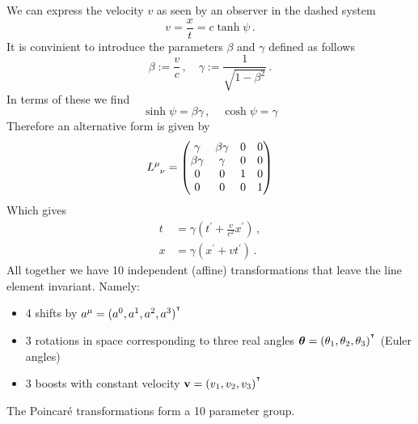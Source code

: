   We can express the velocity $v$ as seen by an observer in the dashed system
  \begin{equation}
  v=\frac{x}{t}=c\tanh\psi\,.
  \end{equation}
  It is convinient to introduce the parameters $\beta$ and $\gamma$ defined as
  follows
  \begin{equation}
  \beta:=\frac{v}{c}\, ,\quad\gamma:=\frac{1}{\sqrt{1-\beta^2}}\, .
  \end{equation}
  In terms of these we find
  \begin{equation}
  \sinh\psi = \beta\gamma\, , \quad \cosh\psi=\gamma
  \end{equation}
  Therefore an alternative form is given by
  \begin{equation}
  \tensor{L}{^\mu_\nu}=\begin{pmatrix}
  \gamma&\beta\gamma & 0&0\\
  \beta\gamma&\gamma &0&0\\
  0&0&1 &0\\
  0&0 &0 &1
  \end{pmatrix}
  \end{equation}
  Which gives 
  \begin{align}
  t&=\gamma\left(t^\prime+\frac{v}{c^2}x^\prime\right)\, ,\\
  x&=\gamma\left(x^\prime+vt^\prime\right)\, .
  \end{align}
All together we have 10 independent (affine) transformations that leave the line
element invariant. Namely:
\begin{itemize}
  \item 4 shifts by $a^\mu=(a^0,a^1,a^2,a^3)^{^\intercal}$
  \item 3 rotations in space corresponding to three real angles
  $\boldsymbol{\theta}=(\theta_1,\theta_2,\theta_3)^{^\intercal}$ (Euler angles)
  \item 3 boosts with constant velocity $\mathbf{v}=(v_1,v_2,v_3)^{^\intercal}$
\end{itemize}
The Poincaré transformations form a 10 parameter group.
